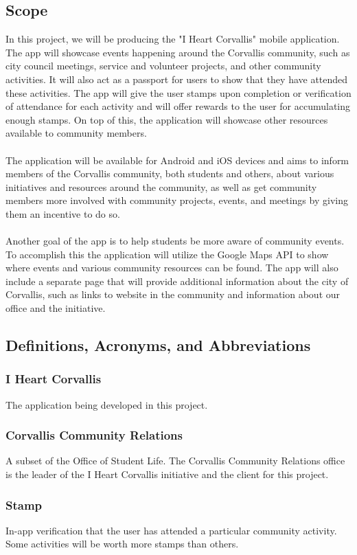 \documentclass[draftclsnofoot, onecolumn, 10pt, compsoc]{IEEEtran}
\begin{document}
		\subsection{Scope}
			In this project, we will be producing the "I Heart Corvallis" mobile application. The app will showcase events happening around the Corvallis community, such as city council meetings, service and volunteer projects, and other community activities. It will also act as a passport for users to show that they have attended these activities. The app will give the user stamps upon completion or verification of attendance for each activity and will offer rewards to the user for accumulating enough stamps. On top of this, the application will showcase other resources available to community members. \\ \\
			The application will be available for Android and iOS devices and aims to inform members of the Corvallis community, both students and others, about various initiatives and resources around the community, as well as get community members more involved with community projects, events, and meetings by giving them an incentive to do so. \\ \\
			Another goal of the app is to help students be more aware of community events.  To accomplish this  the application will utilize the Google Maps API to show where events and various community resources can be found. The app will also include a separate page that will provide additional information about the city of Corvallis, such as links to website in the community and information about our office and the initiative.
			
		\subsection{Definitions, Acronyms, and Abbreviations}
			\subsubsection{I Heart Corvallis} The application being developed in this project.
			\subsubsection{Corvallis Community Relations} A subset of the Office of Student Life. The Corvallis Community Relations office is the leader of the I Heart Corvallis initiative and the client for this project.
			\subsubsection{Stamp} In-app verification that the user has attended a particular community activity. Some activities will be worth more stamps than others.
\end{document}
